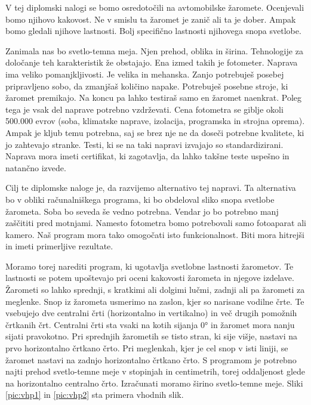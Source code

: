 \documentclass[oneside, a4paper, 12pt]{book}
\begin{document}
V tej diplomski nalogi se bomo osredotočili na avtomobilske žaromete. 
Ocenjevali bomo njihovo kakovost. Ne v smislu ta žaromet je zanič ali 
ta je dober. Ampak bomo gledali njihove lastnosti. Bolj specifično 
lastnosti njihovega snopa svetlobe.

Zanimala nas bo svetlo-temna meja. Njen prehod, oblika in širina. 
Tehnologije za določanje teh karakteristik že obstajajo. Ena izmed 
takih je fotometer. Naprava ima veliko pomanjkljivosti. Je velika in 
mehanska. Zanjo potrebuješ posebej pripravljeno sobo, da zmanjšaš količino 
napake. Potrebuješ posebne stroje, ki žaromet premikajo. Na koncu pa 
lahko testiraš samo en žaromet naenkrat. Poleg tega je vsak del 
naprave potrebno vzdrževati. Cena fotometra se giblje okoli 500.000 evrov
(soba, klimatske naprave, izolacija, programska in strojna oprema).
Ampak je kljub temu potrebna, saj se brez nje ne da doseči potrebne 
kvalitete, ki jo zahtevajo stranke. Tes\-ti, ki se na taki napravi 
izvajajo so standardizirani. Naprava mora imeti certifikat, ki zagotavlja, 
da lahko takšne teste uspešno in natančno izvede.

Cilj te diplomske naloge je, da razvijemo alternativo tej napravi. 
Ta alternativa bo v obliki računalniškega programa, ki bo obdeloval 
sliko snopa svetlobe žarometa. Soba bo seveda še vedno potrebna. 
Vendar jo bo potrebno manj zaščititi pred motnjami. Namesto fotometra 
bomo potrebovali samo fotoaparat ali kamero. Naš program mora tako 
omogočati isto funkcionalnost. Biti mora hitrejši in imeti primerljive 
rezultate.

Moramo torej narediti program, ki ugotavlja svetlobne lastnosti žarometov. 
Te lastnosti se potem upoštevajo pri oceni kakovosti žarometa in njegove 
izdelave. Žarometi so lahko sprednji, s kratkimi ali dolgimi lučmi, zadnji 
ali pa žarometi za meglenke. Snop iz žarometa usmerimo na zaslon, kjer so 
narisane vodilne črte. Te vsebujejo dve centralni črti (horizontalno in 
vertikalno) in več drugih pomožnih črtkanih črt. Centralni črti sta vsaki 
na kotih sijanja 0° in žaromet mora nanju sijati pravokotno. Pri sprednjih 
žarometih se tisto stran, ki sije višje, nastavi na prvo horizontalno 
črtkano črto. Pri meglenkah, kjer je cel snop v isti liniji, se žaromet 
nastavi na zadnjo horizontalno črtkano črto. S programom je potrebno najti 
prehod svetlo-temne meje v stopinjah in centimetrih, torej oddaljenost 
glede na horizontalno centralno črto. Izračunati moramo širino svetlo-temne 
meje. Sliki \ref{pic:vhp1} in \ref{pic:vhp2} sta primera vhodnih slik.
\end{document}

